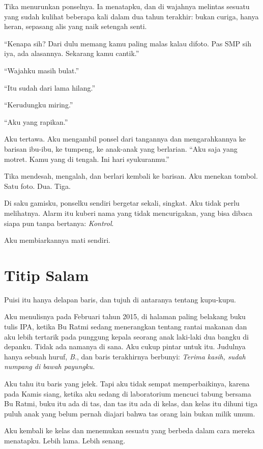 \documentclass[11pt,twoside,openany]{book}
\begin{document}
Tika menurunkan ponselnya. Ia menatapku, dan di wajahnya melintas sesuatu yang sudah kulihat beberapa kali dalam dua tahun terakhir: bukan curiga, hanya heran, sepasang alis yang naik setengah senti.

``Kenapa sih? Dari dulu memang kamu paling malas kalau difoto. Pas SMP sih iya, ada alasannya. Sekarang kamu cantik.''

``Wajahku masih bulat.''

``Itu sudah dari lama hilang.''

``Kerudungku miring.''

``Aku yang rapikan.''

Aku tertawa. Aku mengambil ponsel dari tangannya dan mengarahkannya ke barisan ibu-ibu, ke tumpeng, ke anak-anak yang berlarian. ``Aku saja yang motret. Kamu yang di tengah. Ini hari syukuranmu.''

Tika mendesah, mengalah, dan berlari kembali ke barisan. Aku menekan tombol. Satu foto. Dua. Tiga.

Di saku gamisku, ponselku sendiri bergetar sekali, singkat. Aku tidak perlu melihatnya. Alarm itu kuberi nama yang tidak mencurigakan, yang bisa dibaca siapa pun tanpa bertanya: \emph{Kontrol}.

Aku membiarkannya mati sendiri.

\chapter{Titip Salam}
Puisi itu hanya delapan baris, dan tujuh di antaranya tentang kupu-kupu.

Aku menulisnya pada Februari tahun 2015, di halaman paling belakang buku tulis IPA, ketika Bu Ratmi sedang menerangkan tentang rantai makanan dan aku lebih tertarik pada punggung kepala seorang anak laki-laki dua bangku di depanku. Tidak ada namanya di sana. Aku cukup pintar untuk itu. Judulnya hanya sebuah huruf, \emph{B.}, dan baris terakhirnya berbunyi: \emph{Terima kasih, sudah numpang di bawah payungku.}

Aku tahu itu baris yang jelek. Tapi aku tidak sempat memperbaikinya, karena pada Kamis siang, ketika aku sedang di laboratorium mencuci tabung bersama Bu Ratmi, buku itu ada di tas, dan tas itu ada di kelas, dan kelas itu dihuni tiga puluh anak yang belum pernah diajari bahwa tas orang lain bukan milik umum.

Aku kembali ke kelas dan menemukan sesuatu yang berbeda dalam cara mereka menatapku. Lebih lama. Lebih senang.
\end{document}
